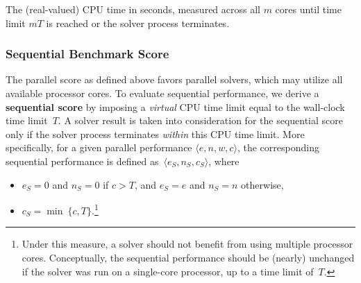 \documentclass[12pt]{article}
\begin{document}
The (real-valued) CPU time in seconds, measured across all $m$ cores
until time limit $mT$ is reached or the solver process
terminates.

\subsubsection{Sequential Benchmark Score}
\label{sec:sequential}

The parallel score as defined above favors parallel solvers, which may utilize
all available processor cores.  To evaluate sequential performance, we derive a
\textbf{sequential score} by imposing a \emph{virtual} CPU time limit equal to
the wall-clock time limit~$T$.  A solver result is taken into consideration for
the sequential score only if the solver process terminates \emph{within} this
CPU time limit.  More specifically, for a given parallel performance $\langle
e, n, w, c\rangle$, the corresponding sequential performance is defined
as~$\langle e_S, n_S, c_S\rangle$, where
\begin{itemize}
\item $e_S = 0$ and $n_S = 0$ if $c > T$, and $e_S = e$ and $n_S = n$
  otherwise,
\item $c_S = \min\ \{c, T\}$.\footnote{Under this
  measure, a solver should not benefit from using multiple processor
  cores.  Conceptually, the sequential performance should be (nearly)
  unchanged if the solver was run on a single-core processor, up to a
  time limit of~$T$.}
\end{itemize}
\end{document}
